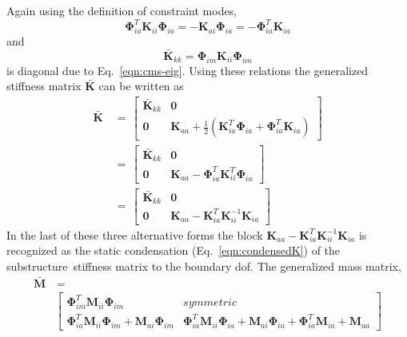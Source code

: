 \documentclass[11pt,openany,twoside]{book}
\numberwithin{equation}{section}		%
\newcommand{\Matrix}[1]{\boldsymbol{#1}}
\newcommand{\Eqn}[1]{Eq.\ \ref{#1}}  %
\newcommand{\Ss}{substructure}
\begin{document}
Again using the definition of constraint modes,
\begin{equation}
\Matrix{\Phi}_{ia}^T \Matrix{K}_{ii} \Matrix{\Phi}_{ia} =
                - \Matrix{K}_{ai} \Matrix{\Phi}_{ia} = - \Matrix{\Phi}_{ia}^T \Matrix{K}_{ia}		\nonumber
\end{equation}
and
\begin{equation}
\Matrix{\bar{K}}_{kk} = \Matrix{\Phi}_{im} \Matrix{K}_{ii} \Matrix{\Phi}_{im}	\nonumber
\end{equation}
is diagonal due to \Eqn{eqn:cms-eig}.
Using these relations the generalized stiffness matrix $\Matrix{\bar{K}}$
can be written as
\begin{equation}
\begin{split}
\Matrix{\bar{K}} & \, = \, \left[
\begin{array}{cc}
   \Matrix{\bar{K}}_{kk} & \Matrix{0} \\
   \Matrix{0} & \Matrix{K}_{aa} + \frac{1}{2} \left( \Matrix{K}_{ia}^T \Matrix{\Phi}_{ia} + \Matrix{\Phi}_{ia}^T \Matrix{K}_{ia} \right)
\end{array}
\right]         \\
 & \, = \, \left[
\begin{array}{cc}
   \Matrix{\bar{K}}_{kk} & \Matrix{0} \\
   \Matrix{0} & \Matrix{K}_{aa} - \Matrix{\Phi}_{ia}^T \Matrix{K}_{ii}^T \Matrix{\Phi}_{ia}
\end{array}
\right]         \\
 & \, = \, \left[
\begin{array}{cc}
   \Matrix{\bar{K}}_{kk} & \Matrix{0} \\
   \Matrix{0} & \Matrix{K}_{aa} - \Matrix{K}_{ia}^T \Matrix{K}_{ii}^{-1} \Matrix{K}_{ia}
\end{array}
\right]
\end{split}			\nonumber
\end{equation}
In the last of these three alternative forms the block
$\Matrix{K}_{aa} - \Matrix{K}_{ia}^T \Matrix{K}_{ii}^{-1} \Matrix{K}_{ia}$
is recognized as the static condensation (\Eqn{eqn:condensedK}) of
the \Ss\ stiffness matrix to the boundary dof. The generalized
mass matrix,
\begin{equation}
\begin{split}
\Matrix{\bar{M}} & \, = \\
 &  \left[
\begin{array}{cc}
   \Matrix{\Phi}_{im}^T \Matrix{M}_{ii} \Matrix{\Phi}_{im} & symmetric \\
   \Matrix{\Phi}_{ia}^T \Matrix{M}_{ii} \Matrix{\Phi}_{im} + \Matrix{M}_{ai} \Matrix{\Phi}_{im} &
                        \Matrix{\Phi}_{ia}^T \Matrix{M}_{ii} \Matrix{\Phi}_{ia} +
                        \Matrix{M}_{ai} \Matrix{\Phi}_{ia} + \Matrix{\Phi}_{ia}^T \Matrix{M}_{ia}
                                + \Matrix{M}_{aa}
\end{array}
\right]
\end{split}		\nonumber
\end{equation}
\end{document}
